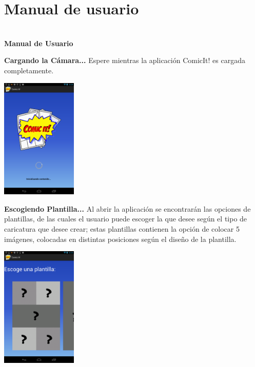 \documentclass[12pt]{report}
\begin{document}
\newpage
\part{Manual de usuario}

\begin{center}	
	\vspace{1em}
		\Huge{\textbf{\\Manual de Usuario	\vspace{1em}}}
	\end{center}	


\begingroup
		\large{
			\textbf{
				Cargando la Cámara...
				\newline
				\newline
			}
		}
	\endgroup
Espere mientras la aplicación ComicIt! es cargada completamente.


	\begin{center}
		\begingroup
			\includegraphics[width=0.27\textwidth]{imagenes_usuario/cargar.png}
		\endgroup
	\end{center}


\begingroup
		\large{
			\textbf{
				Escogiendo Plantilla...
				\newline
				\newline
			}
		}
	\endgroup
Al abrir la aplicación se encontrarán las opciones de plantillas, de las cuales el usuario puede escoger la que desee según el tipo de caricatura que desee crear; estas plantillas contienen la opción de colocar 5 imágenes, colocadas en distintas posiciones según el diseño de la plantilla.

	\begin{center}
		\begingroup
			\includegraphics[width=0.27\textwidth]{imagenes_usuario/plantillas.png}
		\endgroup
	\end{center}
\end{document}
